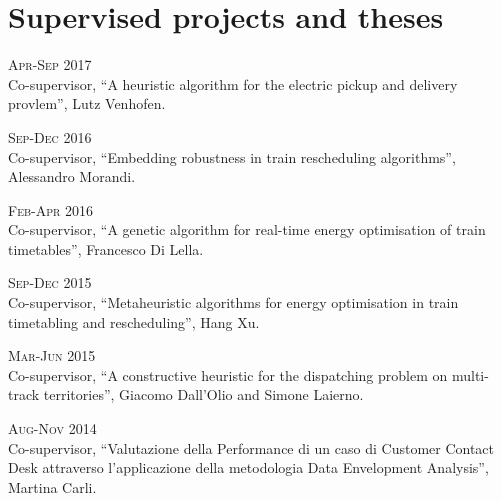 \section*{Supervised projects and theses}

\begin{paracol}{2}
  \textsc{Apr-Sep 2017}
\switchcolumn
  \\
  Co-supervisor, ``A heuristic algorithm for the electric pickup and delivery provlem'', Lutz Venhofen.
\end{paracol}

\begin{paracol}{2}
  \textsc{Sep-Dec 2016}
\switchcolumn
  \\
  Co-supervisor, ``Embedding robustness in train rescheduling algorithms'', Alessandro Morandi.
\end{paracol}

\begin{paracol}{2}
  \textsc{Feb-Apr 2016}
\switchcolumn
  \\
  Co-supervisor, ``A genetic algorithm for real-time energy optimisation of train timetables'', Francesco Di Lella.
\end{paracol}

\begin{paracol}{2}
  \textsc{Sep-Dec 2015}
\switchcolumn
  \\
  Co-supervisor, ``Metaheuristic algorithms for energy optimisation in train timetabling and rescheduling'', Hang Xu.
\end{paracol}

\begin{paracol}{2}
  \textsc{Mar-Jun 2015}
\switchcolumn
  \\
  Co-supervisor, ``A constructive heuristic for the dispatching problem on multi-track territories'', Giacomo Dall'Olio and Simone Laierno.
\end{paracol}

\begin{paracol}{2}
  \textsc{Aug-Nov 2014}
\switchcolumn
  \\
  Co-supervisor, ``Valutazione della Performance di un caso di Customer Contact Desk attraverso l'applicazione della metodologia Data Envelopment Analysis'', Martina Carli.
\end{paracol}
